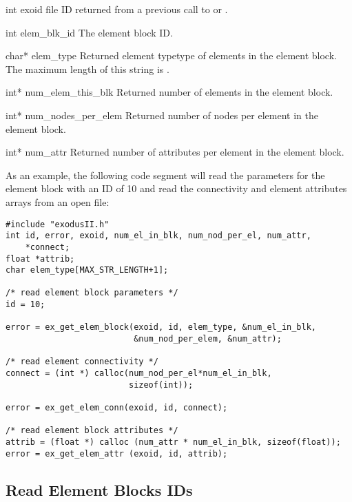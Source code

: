 
\begin{parameters}
\item[{int exoid \R{}}]
\exo{} file ID returned from a previous call to  or
.

\item[{int elem_blk_id \R{}}]
The element block ID.

\item[{char* elem_type \W{}}]
Returned element typetype of elements in the element block.
The maximum length of this string is .

\item[{int* num_elem_this_blk \W{}}]
Returned number of elements in the element block.

\item[{int* num_nodes_per_elem \W{}}]
Returned number of nodes per element in the element block.

\item[{int* num_attr \W{}}]
Returned number of attributes per element in the element block.
\end{parameters}


As an example, the following code segment will read the parameters for
the element block with an ID of 10 and read the connectivity and
element attributes arrays from an open \exo{} file:
\begin{lstlisting}
#include "exodusII.h"
int id, error, exoid, num_el_in_blk, num_nod_per_el, num_attr,
    *connect;
float *attrib;
char elem_type[MAX_STR_LENGTH+1];

/* read element block parameters */
id = 10;

error = ex_get_elem_block(exoid, id, elem_type, &num_el_in_blk,
                          &num_nod_per_elem, &num_attr);

/* read element connectivity */
connect = (int *) calloc(num_nod_per_el*num_el_in_blk,
                         sizeof(int));

error = ex_get_elem_conn(exoid, id, connect);

/* read element block attributes */
attrib = (float *) calloc (num_attr * num_el_in_blk, sizeof(float));
error = ex_get_elem_attr (exoid, id, attrib);
\end{lstlisting}

\subsection{Read Element Blocks IDs}


